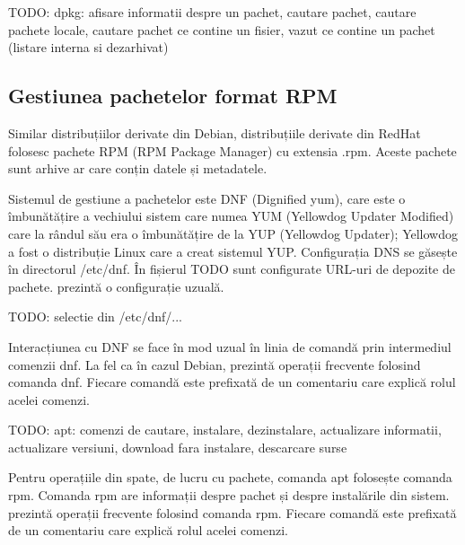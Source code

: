 \begin{screen}[caption={Operații frecvente cu dpkg},label={lst:package:dpkg}]
TODO: dpkg: afisare informatii despre un pachet, cautare pachet, cautare pachete locale, cautare pachet ce contine un fisier, vazut ce contine un pachet (listare interna si dezarhivat)
\end{screen}

\subsection{Gestiunea pachetelor format RPM}
\label{sec:package:rpm}

Similar distribuțiilor derivate din Debian, distribuțiile derivate din RedHat folosesc pachete RPM (RPM Package Manager) cu extensia .rpm.
 Aceste pachete sunt arhive ar care conțin datele și metadatele.

Sistemul de gestiune a pachetelor este DNF (Dignified yum), care este o îmbunătățire a vechiului sistem care numea YUM (Yellowdog Updater Modified) care la rândul său era o îmbunătățire de la YUP (Yellowdog Updater); Yellowdog a fost o distribuție Linux care a creat sistemul YUP. Configurația DNS se găsește în directorul /etc/dnf. În fișierul TODO sunt configurate URL-uri de depozite de pachete.  prezintă o configurație uzuală.

\begin{screen}[caption={Configurație DNF (RedHat)},label={lst:package:rpm-config}]
TODO: selectie din /etc/dnf/...
\end{screen}

Interacțiunea cu DNF se face în mod uzual în linia de comandă prin intermediul comenzii dnf. La fel ca în cazul Debian,  prezintă operații frecvente folosind comanda dnf. Fiecare comandă este prefixată de un comentariu care explică rolul acelei comenzi.

\begin{screen}[caption={Operații frecvente cu dnf},label={lst:package:dnf}]
TODO: apt: comenzi de cautare, instalare, dezinstalare, actualizare informatii, actualizare versiuni, download fara instalare, descarcare surse
\end{screen}

Pentru operațiile din spate, de lucru cu pachete, comanda apt folosește comanda rpm. Comanda rpm are informații despre pachet și despre instalările din sistem.  prezintă operații frecvente folosind comanda rpm. Fiecare comandă este prefixată de un comentariu care explică rolul acelei comenzi.

